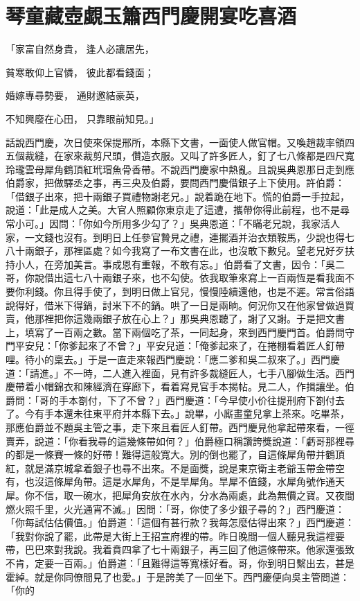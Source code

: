 %

\chapter{琴童藏壺覷玉簫\KG 西門慶開宴吃喜酒}


「家富自然身貴，   逢人必讓居先，

貧寒敢仰上官憐，  彼此都看錢面；

婚嫁專尋勢要，   通財邀結豪英，

不知興廢在心田，  只靠眼前知見。」

話說西門慶，次日使來保提邢所，本縣下文書，一面使人做官帽。又喚趙裁率領四五個裁縫，在家來裁剪尺頭，儹造衣服。又叫了許多匠人，釘了七八條都是四尺寬玲瓏雲母犀角鶴頂紅玳瑁魚骨香帶。不說西門慶家中熱亂。且說吳典恩那日走到應伯爵家，把做驛丞之事，再三央及伯爵，要問西門慶借銀子上下使用。許伯爵：「借銀子出來，把十兩銀子買禮物謝老兄。」說着跪在地下。慌的伯爵一手拉起，說道：「此是成人之美。大官人照顧你東京走了這遭，攜帶你得此前程，也不是尋常小可。」因問：「你如今所用多少勾了？」吳典恩道：「不瞞老兄說，我家活人家，一文錢也沒有。到明日上任參官贄見之禮，連擺酒并治衣類鞍馬，少說也得七八十兩銀子，那裡區處？如今我寫了一布文書在此，也沒敢下數兒。望老兄好歹扶持小人，在旁加美言。事成恩有重報，不敢有忘。」伯爵看了文書，因令：「吳二哥，你說借出這七八十兩銀子來，也不勾使。依我取筆來寫上一百兩恆是看我面不要你利錢。你且得手使了，到明日做上官兒，慢慢陸續還他，也是不遲。常言俗語說得好，借米下得鍋，討米下不的鍋。哄了一日是兩晌。何況你又在他家曾做過買賣，他那裡把你這幾兩銀子放在心上？」那吳典恩聽了，謝了又謝。于是把文書上，填寫了一百兩之數。當下兩個吃了茶，一同起身，來到西門慶門首。伯爵問守門平安兒：「你爹起來了不曾？」平安兒道：「俺爹起來了，在捲棚看着匠人釘帶哩。待小的稟去。」于是一直走來報西門慶說：「應二爹和吳二叔來了。」西門慶道：「請進。」不一時，二人進入裡面，見有許多裁縫匠人，七手八腳做生活。西門慶帶着小帽錦衣和陳經濟在穿廊下，看着寫見官手本揭帖。見二人，作揖讓坐。伯爵問：「哥的手本劄付，下了不曾？」西門慶道：「今早使小价往提刑府下劄付去了。今有手本還未往東平府并本縣下去。」說畢，小廝畫童兒拿上茶來。吃畢茶，那應伯爵並不題吳主管之事，走下來且看匠人釘帶。西門慶見他拿起帶來看，一徑賣弄，說道：「你看我尋的這幾條帶如何？」伯爵極口稱讚誇獎說道：「虧哥那裡尋的都是一條賽一條的好帶！難得這般寬大。別的倒也罷了，自這條犀角帶并鶴頂紅，就是滿京城拿着銀子也尋不出來。不是面獎，說是東京衛主老爺玉帶金帶空有，也沒這條犀角帶。這是水犀角，不是旱犀角。旱犀不值錢，水犀角號作通天犀。你不信，取一碗水，把犀角安放在水內，分水為兩處，此為無價之寶。又夜間燃火照千里，火光通宵不滅。」因問：「哥，你使了多少銀子尋的？」西門慶道：「你每試估估價值。」伯爵道：「這個有甚行款？我每怎麼估得出來？」西門慶道：「我對你說了罷，此帶是大街上王招宣府裡的帶。昨日晚間一個人聽見我這裡要帶，巴巴來對我說。我着賁四拿了七十兩銀子，再三回了他這條帶來。他家還張致不肯，定要一百兩。」伯爵道：「且難得這等寬樣好看。哥，你到明日繫出去，甚是霍綽。就是你同僚間見了也愛。」于是誇美了一回坐下。西門慶便向吳主管問道：「你的